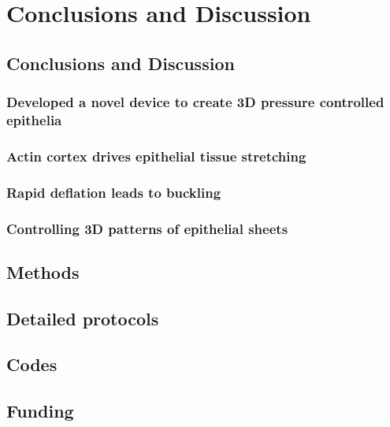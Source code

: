 \documentclass[12pt]{ociamthesis}  %
\begin{document}
\part{Conclusions and Discussion}
\chapter{Conclusions and Discussion}
\section{Developed a novel device to create 3D pressure controlled epithelia}
\section{Actin cortex drives epithelial tissue stretching}
\section{Rapid deflation leads to buckling}
\section{Controlling 3D patterns of epithelial sheets}

\begin{appendices}
	\chapter{Methods}
	
	\chapter{Detailed protocols}
	\chapter{Codes}
	\chapter{Funding}
\end{appendices}

\end{document}
